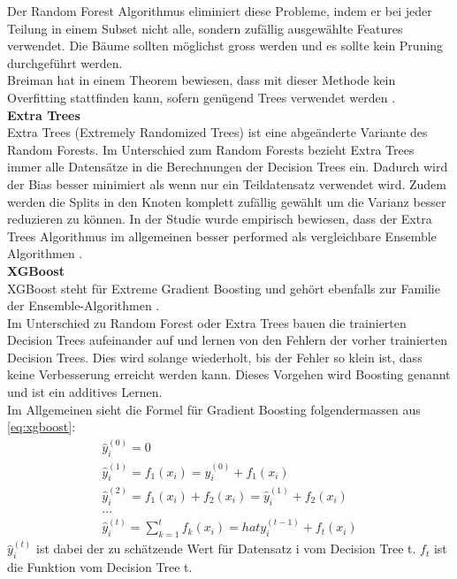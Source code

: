 Der Random Forest Algorithmus eliminiert diese Probleme, indem er bei jeder Teilung in einem Subset nicht alle, sondern zufällig ausgewählte Features verwendet.
Die Bäume sollten möglichst gross werden und es sollte kein Pruning durchgeführt werden.\\
Breiman hat in einem Theorem bewiesen, dass mit dieser Methode kein Overfitting stattfinden kann, sofern genügend Trees verwendet werden \cite{random_forest, random_forest_1}.\\[2ex]
%
\textbf{Extra Trees}\\
Extra Trees (Extremely Randomized Trees) ist eine abgeänderte Variante des Random Forests. Im Unterschied zum Random Forests bezieht Extra Trees immer alle Datensätze in die Berechnungen der Decision Trees ein. Dadurch wird der Bias besser minimiert als wenn nur ein Teildatensatz verwendet wird. Zudem werden die Splits in den Knoten komplett zufällig gewählt um die Varianz besser reduzieren zu können. In der Studie wurde empirisch bewiesen, dass der Extra Trees Algorithmus im allgemeinen besser performed als vergleichbare Ensemble Algorithmen \cite{extrem_forest}.\\[2ex]
%
\textbf{XGBoost}\\
XGBoost steht für Extreme Gradient Boosting und gehört ebenfalls zur Familie der Ensemble-Algorithmen \cite{xgboost}.\\
Im Unterschied zu Random Forest oder Extra Trees bauen die trainierten Decision Trees aufeinander auf und lernen von den Fehlern der vorher trainierten Decision Trees. Dies wird solange wiederholt, bis der Fehler so klein ist, dass keine Verbesserung erreicht werden kann. Dieses Vorgehen wird Boosting genannt und ist ein additives Lernen.\\
Im Allgemeinen sieht die Formel für Gradient Boosting folgendermassen aus \eqref{eq:xgboost}:
\begin{equation}
\label{eq:xgboost}
\begin{split}
\hat{y}_{i}^{(0)} = 0\\
\hat{y}_{i}^{(1)} = f_1(x_i) = \hat{y}_{i}^{(0)} + f_1(x_i)\\
\hat{y}_{i}^{(2)} = f_1(x_i) + f_2(x_i)= \hat{y}_{i}^{(1)} + f_2(x_i)\\
\text{...}\\
\hat{y}_{i}^{(t)} = \sum_{k=1}^{t} f_k(x_i) = hat{y}_{i}^{(t-1)} + f_t(x_i)
\end{split}
\end{equation}
\newline
%
$\hat{y}_{i}^{(t)}$ ist dabei der zu schätzende Wert für Datensatz i vom Decision Tree t. $f_t$ ist die Funktion vom Decision Tree t.\\[2ex]
